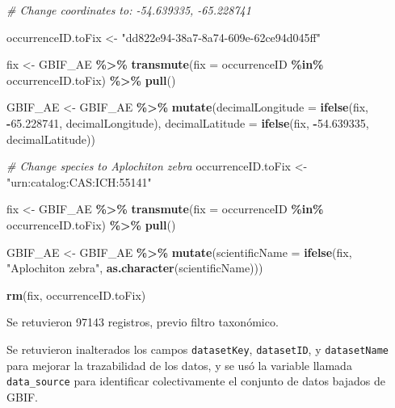 \documentclass[sn-apa,pdflatex]{sn-jnl}
\newenvironment{Shaded}{\begin{snugshade}}{\end{snugshade}}
\newcommand{\AttributeTok}[1]{\textcolor[rgb]{0.13,0.29,0.53}{#1}}
\newcommand{\CommentTok}[1]{\textcolor[rgb]{0.56,0.35,0.01}{\textit{#1}}}
\newcommand{\FloatTok}[1]{\textcolor[rgb]{0.00,0.00,0.81}{#1}}
\newcommand{\FunctionTok}[1]{\textcolor[rgb]{0.13,0.29,0.53}{\textbf{#1}}}
\newcommand{\NormalTok}[1]{#1}
\newcommand{\OtherTok}[1]{\textcolor[rgb]{0.56,0.35,0.01}{#1}}
\newcommand{\SpecialCharTok}[1]{\textcolor[rgb]{0.81,0.36,0.00}{\textbf{#1}}}
\newcommand{\StringTok}[1]{\textcolor[rgb]{0.31,0.60,0.02}{#1}}
\begin{document}
\begin{Shaded}
\begin{Highlighting}[]
\CommentTok{\# Change coordinates to: {-}54.639335, {-}65.228741}

\NormalTok{occurrenceID.toFix }\OtherTok{\textless{}{-}} \StringTok{"dd822e94{-}38a7{-}8a74{-}609e{-}62ce94d045ff"}

\NormalTok{fix }\OtherTok{\textless{}{-}}\NormalTok{ GBIF\_AE }\SpecialCharTok{\%\textgreater{}\%}
    \FunctionTok{transmute}\NormalTok{(}\AttributeTok{fix =}\NormalTok{ occurrenceID }\SpecialCharTok{\%in\%}\NormalTok{ occurrenceID.toFix) }\SpecialCharTok{\%\textgreater{}\%}
    \FunctionTok{pull}\NormalTok{()}

\NormalTok{GBIF\_AE }\OtherTok{\textless{}{-}}\NormalTok{ GBIF\_AE }\SpecialCharTok{\%\textgreater{}\%}
    \FunctionTok{mutate}\NormalTok{(}\AttributeTok{decimalLongitude =} \FunctionTok{ifelse}\NormalTok{(fix, }\SpecialCharTok{{-}}\FloatTok{65.228741}\NormalTok{, decimalLongitude),}
        \AttributeTok{decimalLatitude =} \FunctionTok{ifelse}\NormalTok{(fix, }\SpecialCharTok{{-}}\FloatTok{54.639335}\NormalTok{, decimalLatitude))}

\CommentTok{\# Change species to Aplochiton zebra}
\NormalTok{occurrenceID.toFix }\OtherTok{\textless{}{-}} \StringTok{"urn:catalog:CAS:ICH:55141"}

\NormalTok{fix }\OtherTok{\textless{}{-}}\NormalTok{ GBIF\_AE }\SpecialCharTok{\%\textgreater{}\%}
    \FunctionTok{transmute}\NormalTok{(}\AttributeTok{fix =}\NormalTok{ occurrenceID }\SpecialCharTok{\%in\%}\NormalTok{ occurrenceID.toFix) }\SpecialCharTok{\%\textgreater{}\%}
    \FunctionTok{pull}\NormalTok{()}

\NormalTok{GBIF\_AE }\OtherTok{\textless{}{-}}\NormalTok{ GBIF\_AE }\SpecialCharTok{\%\textgreater{}\%}
    \FunctionTok{mutate}\NormalTok{(}\AttributeTok{scientificName =} \FunctionTok{ifelse}\NormalTok{(fix, }\StringTok{"Aplochiton zebra"}\NormalTok{, }\FunctionTok{as.character}\NormalTok{(scientificName)))}

\FunctionTok{rm}\NormalTok{(fix, occurrenceID.toFix)}
\end{Highlighting}
\end{Shaded}

Se retuvieron 97143 registros, previo filtro taxonómico.

Se retuvieron inalterados los campos \texttt{datasetKey},
\texttt{datasetID}, y \texttt{datasetName} para mejorar la trazabilidad
de los datos, y se usó la variable llamada \texttt{data\_source} para
identificar colectivamente el conjunto de datos bajados de GBIF.
\end{document}
